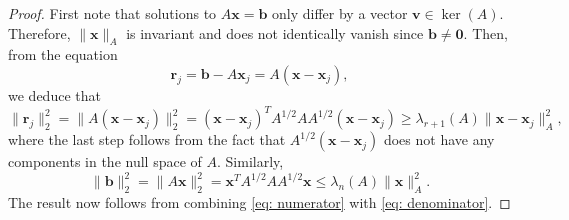 \documentclass[10pt,a4paper]{amsart}
\begin{document}
\begin{proof}
First note that solutions to $A\bm{x}=\bm{b}$ only differ by a vector $\bm{v} \in \ker(A)$. Therefore, $\|\bm{x}\|_A$ is invariant and does not identically vanish since $\bm{b} \neq \bm{0}$.
Then, from the equation
\begin{equation*}
    \bm{r}_j = \bm{b} - A\bm{x}_j = A(\bm{x}-\bm{x}_j),
\end{equation*}
we deduce that
\begin{equation}
    \|\bm{r}_j\|_2^2 = \|A(\bm{x}-\bm{x}_j)\|_2^2 =(\bm{x}-\bm{x}_j)^TA^{1/2}AA^{1/2}(\bm{x}-\bm{x}_j) \geq \lambda_{r+1}(A)\|\bm{x}-\bm{x}_j\|_A^2, \label{eq: numerator}
\end{equation}
where the last step follows from the fact that $A^{1/2}(\bm{x}-\bm{x}_j)$ does not have any components in the null space of $A$. Similarly,
\begin{equation}
\label{eq: denominator}
    \|\bm{b}\|_2^2 = \|A\bm{x}\|_2^2 = \bm{x}^TA^{1/2}AA^{1/2}\bm{x} \leq \lambda_n(A)\|\bm{x}\|_A^2.
\end{equation}
The result now follows from combining \eqref{eq: numerator} with \eqref{eq: denominator}.
\end{proof}
\end{document}
